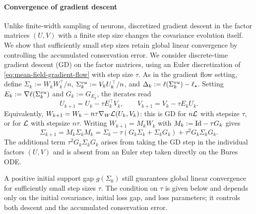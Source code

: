 \paragraph{Convergence of gradient descent}
Unlike finite-width sampling of neurons, discretized gradient descent in the factor matrices $(U, V)$ with a finite step size changes the covariance evolution itself.
We show that sufficiently small step sizes retain global linear convergence by controlling the accumulated conservation error.
We consider discrete-time gradient descent (GD) on the factor matrices, using an Euler discretization of \eqref{eq:mean-field-gradient-flow} with step size $\tau$.
As in the gradient flow setting, define $\Sigma_k:=W_kW_k^\top/n$, $\Sigma^{vu}_k:=V_kU_k^\top/n$, and $\Delta_k:=\ell(\Sigma^{vu}_k)-\ell_\star$.
Setting $E_k:=\nabla\ell(\Sigma^{vu}_k)$ and $G_k:=G_{E_k}$, the iterates read
\begin{equation}\label{eq:gd-algorithm}
 U_{k+1}=U_k-\tau E_k^\top V_k,\qquad
 V_{k+1}=V_k-\tau E_kU_k.
\end{equation}
Equivalently, $W_{k+1}=W_k-n\tau\nabla_W\mathcal L(U_k,V_k)$: this is GD for $n\mathcal L$ with stepsize $\tau$, or for $\mathcal L$ with stepsize $n\tau$.
Writing $W_{k+1}=M_kW_k$ with $M_k:=\mathrm{Id}-\tau G_k$ gives
\begin{equation}\label{eq:gd-covariance}
 \Sigma_{k+1}=M_k\Sigma_kM_k
 =\Sigma_k-\tau(G_k\Sigma_k+\Sigma_kG_k)+\tau^2G_k\Sigma_kG_k.
\end{equation}
The additional term $\tau^2G_k\Sigma_kG_k$ arises from taking the GD step in the individual factors $(U,V)$ and is absent from an Euler step taken directly on the Bures ODE.

A positive initial support gap $g(\Sigma_0)$ still guarantees global linear convergence for sufficiently small step sizes $\tau$.
The condition on $\tau$ is given below and depends only on the initial covariance, initial loss gap, and loss parameters; it controls both
descent and the accumulated conservation error.

